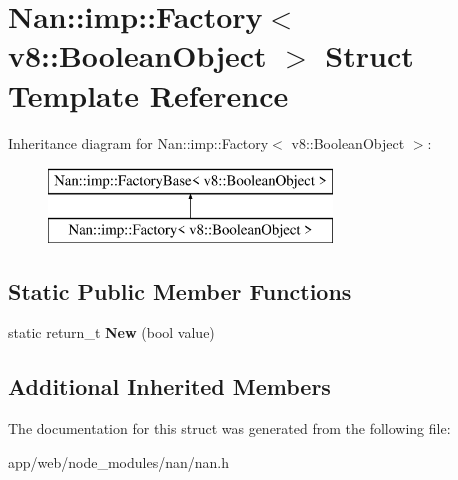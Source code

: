 \hypertarget{struct_nan_1_1imp_1_1_factory_3_01v8_1_1_boolean_object_01_4}{}\section{Nan\+:\+:imp\+:\+:Factory$<$ v8\+:\+:Boolean\+Object $>$ Struct Template Reference}
\label{struct_nan_1_1imp_1_1_factory_3_01v8_1_1_boolean_object_01_4}
Inheritance diagram for Nan\+:\+:imp\+:\+:Factory$<$ v8\+:\+:Boolean\+Object $>$\+:\begin{figure}[H]
\begin{center}
\leavevmode
\includegraphics[height=2.000000cm]{struct_nan_1_1imp_1_1_factory_3_01v8_1_1_boolean_object_01_4}
\end{center}
\end{figure}
\subsection*{Static Public Member Functions}
\begin{DoxyCompactItemize}
\item 
\mbox{\label{struct_nan_1_1imp_1_1_factory_3_01v8_1_1_boolean_object_01_4_a578d4270d3c551569a9e9680e3c8764b}} 
static return\+\_\+t {\bfseries New} (bool value)
\end{DoxyCompactItemize}
\subsection*{Additional Inherited Members}


The documentation for this struct was generated from the following file\+:\begin{DoxyCompactItemize}
\item 
app/web/node\+\_\+modules/nan/nan.\+h\end{DoxyCompactItemize}
